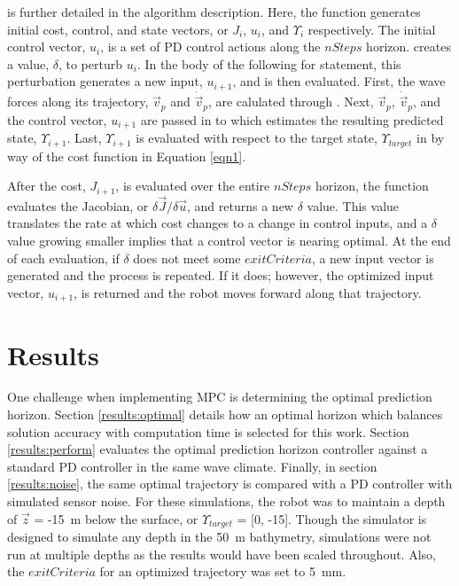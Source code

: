 \documentclass[letterpaper, 10 pt, conferences]{ieeeconf}  %
\begin{document}
 is further detailed in the algorithm description. Here, the function  generates initial cost, control, and state vectors, or $J_i$, $u_i$, and $\Upsilon_i$ respectively. The initial control vector, $u_i$, is a set of PD control actions along the $nSteps$ horizon.  creates a value, $\delta$, to perturb $u_i$. In the body of the following for statement, this perturbation generates a new input, $u_{i+1}$, and is then evaluated. First, the wave forces along its trajectory, $\vec{v}_p$ and $\dot{\vec{v}}_p$, are calulated through . Next, $\vec{v}_p$, $\dot{\vec{v}}_p$, and the control vector, $u_{i+1}$ are passed in to  which estimates the resulting predicted state, $\Upsilon_{i+1}$. Last, $\Upsilon_{i+1}$ is evaluated with respect to the target state, $\Upsilon_{target}$ in  by way of the cost function in Equation \ref{eqn1}.

After the cost, $J_{i+1}$, is evaluated over the entire $nSteps$ horizon, the function  evaluates the Jacobian, or $\delta \vec{J} / \delta \vec{u}$, and returns a new $\delta$ value. This value translates the rate at which cost changes to a change in control inputs, and a $\delta$ value growing smaller implies that a control vector is nearing optimal.  At the end of each evaluation, if $\delta$ does not meet some $exitCriteria$, a new input vector is generated and the process is repeated. If it does; however, the optimized input vector, $u_{i+1}$, is returned and the robot moves forward along that trajectory. 

\section{Results} 
\label{sec:results}

One challenge when implementing MPC is determining the optimal prediction horizon. Section \ref{results:optimal} details how an optimal horizon which balances solution accuracy with computation time is selected for this work. Section \ref{results:perform} evaluates the optimal prediction horizon controller against a standard PD controller in the same wave climate. Finally, in section \ref{results:noise}, the same optimal trajectory is compared with a PD controller with simulated sensor noise. For these simulations, the robot was to maintain a depth of $\vec{z}$ = -15~m below the surface, or $\Upsilon_{target}$ = [0, -15]. Though the simulator is designed to simulate any depth in the 50~m bathymetry, simulations were not run at multiple depths as the results would have been scaled throughout. Also, the $exitCriteria$ for an optimized trajectory was set to 5~mm. 
\end{document}

